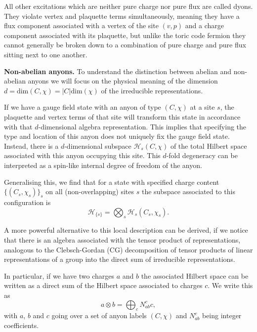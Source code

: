 \documentclass[a4paper,twocolumn,11pt, accepted=2024-06-14]{quantumarticle}
\begin{document}
All other excitations which are neither pure charge nor pure flux are called dyons. They violate vertex and plaquette terms simultaneously, meaning they have a flux component associated with a vertex of the site $(v,p)$ and a charge component associated with its plaquette, but unlike the toric code fermion they cannot generally be broken down to a combination of pure charge and pure flux sitting next to one another.

\textbf{Non-abelian anyons.} To understand the distinction between abelian and non-abelian anyons we will focus on the physical meaning of the dimension $d = \text{dim}(C, \chi) = |C|\text{dim}(\chi)$ of the irreducible representations.

If we have a gauge field state with an anyon of type $(C, \chi)$ at a site $s$, the plaquette and vertex terms of that site will transform this state in accordance with that $d$-dimensional algebra representation. This implies that specifying the type and location of this anyon does not uniquely fix the gauge field state. Instead, there is a $d$-dimensional subspace $\mathcal H_s(C,\chi)$ of the total Hilbert space associated with this anyon occupying this site. This $d$-fold degeneracy can be interpreted as a spin-like internal degree of freedom of the anyon.

Generalising this, we find that for a state with specified charge content $\{(C_s, \chi_s)\}_s$ on all (non-overlapping) sites $s$ the subspace associated to this configuration is
\begin{equation}
	\mathcal{H}_{\{s\}} = \bigotimes_s \mathcal H_s (C_s, \chi_s).
\end{equation}

A more powerful alternative to this local description can be derived, if we notice that
there is an algebra associated with the tensor product of representations, analogous to the Clebsch-Gordan (CG) decomposition of tensor products of linear representations of a group into the direct sum of irreducible representations. 

In particular, if we have two charges $a$ and $b$ the associated Hilbert space can be written as a direct sum of the Hilbert space associated to charges $c$. We write this as 
\begin{equation}
	a \otimes b = \bigoplus_{c}N^c_{ab} c,\label{eqn:fuse} 
\end{equation}
with $a$, $b$ and $c$ going over a set of anyon labels $(C, \chi)$ and $N_{ab}^c$ being integer coefficients. 
\end{document}
